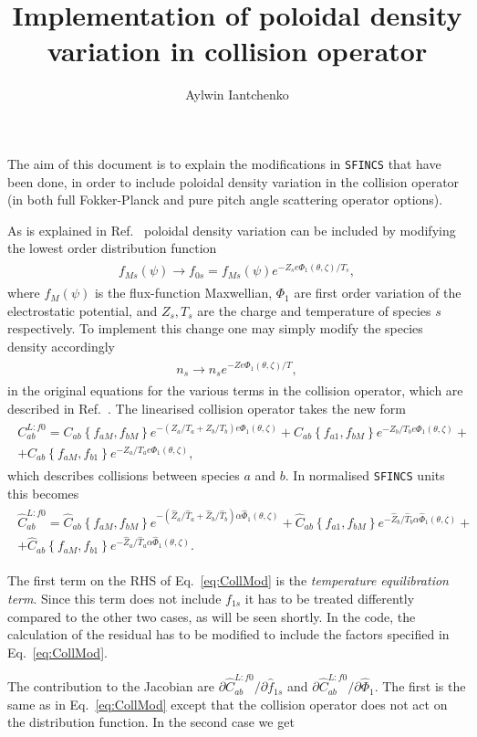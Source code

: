 \documentclass[12pt]{article}
\title{Implementation of poloidal density variation in collision operator}
\author{Aylwin Iantchenko}
\newcommand{\eq}[1]{\begin{align*}\begin{gathered}#1\end{gathered}\end{align*}}
\newcommand{\eqre}[1]{\begin{align}\begin{gathered}#1\end{gathered}\end{align}}
\begin{document}
\titlepage

\maketitle

The aim of this document is to explain the modifications in \texttt{SFINCS} that have been done, in order to include poloidal density variation in the collision operator (in both full Fokker-Planck and pure pitch angle scattering operator options). 

As is explained in Ref.~\cite{ref:PolVarColl_stefan} poloidal density variation can be included by modifying the lowest order distribution function 
\eq{
f_{Ms}(\psi) \rightarrow f_{0s} = f_{Ms}(\psi)e^{-Z_se\Phi_1(\theta,\zeta)/T_s},
}
where $f_M(\psi)$ is the flux-function Maxwellian, $\Phi_1$ are first order variation of the electrostatic potential, and $Z_s,T_s$ are the charge and temperature of species $s$ respectively. To implement this change one may simply modify the species density accordingly
\eqre{
\label{eq:densMod}
n_s \rightarrow n_se^{-Ze\Phi_1(\theta,\zeta)/T},
}
in the original equations for the various terms in the collision operator, which are described in Ref.~\cite{ref:Coll1}. The linearised collision operator takes the new form
\eqre{
C_{ab}^{L:f0} =  C_{ab}\left\{f_{aM},f_{bM}\right\}e^{-\left(Z_a/T_a + Z_b/T_b\right)e\Phi_1(\theta,\zeta)} + C_{ab}\left\{f_{a1},f_{bM}\right\}e^{-Z_b/T_be\Phi_1(\theta,\zeta)} + \\ + C_{ab}\left\{f_{aM},f_{b1}\right\}e^{-Z_a/T_ae\Phi_1(\theta,\zeta)},
}
which describes collisions between species $a$ and $b$. In normalised \texttt{SFINCS} units this becomes
\eqre{
\label{eq:CollMod}
\hat C_{ab}^{L:f0} = \hat C_{ab}\left\{f_{aM},f_{bM}\right\}e^{-\left(\hat Z_a/\hat T_a + \hat Z_b/\hat T_b\right) \alpha\hat\Phi_1(\theta,\zeta)} + \hat C_{ab}\left\{f_{a1},f_{bM}\right\}e^{-\hat Z_b/\hat T_b \alpha\hat\Phi_1(\theta,\zeta)} + \\ + \hat C_{ab}\left\{f_{aM},f_{b1}\right\}e^{-\hat Z_a/\hat T_a\alpha\hat\Phi_1(\theta,\zeta)}.
}

\noindent
The first term on the RHS of Eq.~\eqref{eq:CollMod} is the \textit{temperature equilibration term}. Since this term does not include $f_{1s}$ it has to be treated differently compared to the other two cases, as will be seen shortly. In the code, the calculation of the residual has to be modified to include the factors specified in Eq.~\eqref{eq:CollMod}. 

The contribution to the Jacobian are $\partial \hat C_{ab}^{L:f0}/\partial \hat f_{1s}$ and $\partial \hat C_{ab}^{L:f0}/\partial \hat \Phi_1$. The first is the same as in Eq.~\eqref{eq:CollMod} except that the collision operator does not act on the distribution function. In the second case we get 
\end{document}
